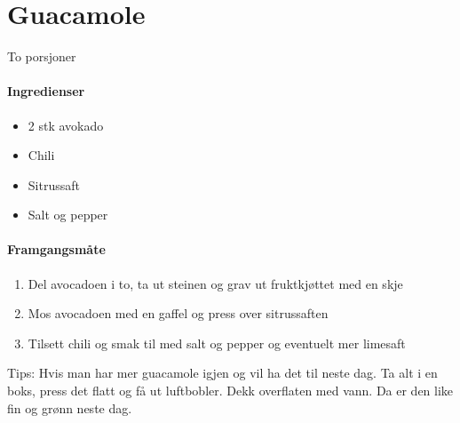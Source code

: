 \section{Guacamole}
\label{guacamole}
To porsjoner

\paragraph{Ingredienser}
\begin{itemize}[noitemsep]
	\item 2 stk avokado
	\item Chili
	\item Sitrussaft
	\item Salt og pepper
\end{itemize}


\paragraph{Framgangsmåte}
\begin{enumerate}[noitemsep]
	\item Del avocadoen i to, ta ut steinen og grav ut fruktkjøttet med en skje
	\item Mos avocadoen med en gaffel og press over sitrussaften
	\item Tilsett chili og smak til med salt og pepper og eventuelt mer limesaft
\end{enumerate}


Tips: Hvis man har mer guacamole igjen og vil ha det til neste dag. Ta alt i en boks, press det flatt og få ut luftbobler. Dekk overflaten med vann. Da er den like fin og grønn neste dag.

